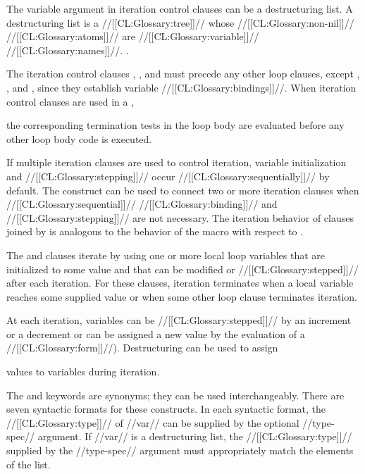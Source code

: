 The variable argument in iteration control clauses can be a 
destructuring list.  A destructuring list
is a //[[CL:Glossary:tree]]// whose //[[CL:Glossary:non-nil]]// //[[CL:Glossary:atoms]]// are //[[CL:Glossary:variable]]// //[[CL:Glossary:names]]//.
\Seesection\DestructuringLOOPVars.
 
The iteration control clauses , ,  and  
must precede any other loop clauses, except
  , , and ,
since they establish variable //[[CL:Glossary:bindings]]//.  
When iteration control clauses are
used in a ,

the corresponding
termination tests in the loop body are evaluated
before any other loop body code is executed.
 
 
If multiple iteration clauses are used to control iteration, variable
initialization and //[[CL:Glossary:stepping]]// occur //[[CL:Glossary:sequentially]]// by default.  
The  construct can be used to connect two or more
iteration clauses when //[[CL:Glossary:sequential]]// //[[CL:Glossary:binding]]// and 
//[[CL:Glossary:stepping]]// are not necessary.
The iteration behavior of clauses joined by 
is analogous to the behavior of the macro  with
respect to .

The  and  clauses iterate by using one or more local 
loop  variables that are initialized to some value and that 
can be modified or //[[CL:Glossary:stepped]]// after each iteration.  
For these clauses, iteration terminates when a local
variable reaches some supplied value or when some other loop clause
terminates iteration.

At each iteration, variables can be 
   //[[CL:Glossary:stepped]]// by an increment or a decrement
or can be assigned a new value by the evaluation of a //[[CL:Glossary:form]]//).
Destructuring can be used to assign 


values to variables during iteration. 

The  and  keywords are synonyms; they can be used
interchangeably.  There are seven syntactic formats for these constructs.
In each syntactic format, the //[[CL:Glossary:type]]// of
//var// can be supplied by the optional //type-spec//
argument.  If //var// is a destructuring list, the //[[CL:Glossary:type]]//
supplied by the //type-spec// argument must appropriately match
the elements of the list.  

